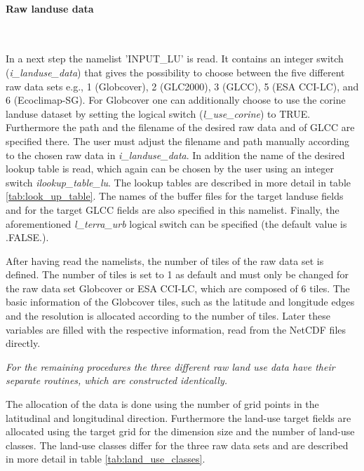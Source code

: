 \documentclass[a4paper,10pt,DIV14,BCOR1cm,titlepage,twoside]{scrartcl}
\begin{document}
\paragraph{Raw landuse data} \ \par\medskip\noindent
In a next step the namelist 'INPUT\_LU' is read. It contains an integer switch (\textit{i\_landuse\_data}) that gives the possibility to choose between the five different raw data sets e.g., 1 (Globcover), 2 (GLC2000), 3 (GLCC), 5 (ESA CCI-LC), and 6 (Ecoclimap-SG). For Globcover one can additionally choose to use the corine landuse dataset by setting the logical switch (\textit{l\_use\_corine}) to TRUE.  Furthermore the path and the filename of the desired raw data and of GLCC are specified there. The user must adjust the filename and path manually according to the chosen raw data in \textit{i\_landuse\_data}. In addition the name of the desired lookup table is read, which again can be chosen by the user using an integer switch \textit{ilookup\_table\_lu}. The lookup tables are described in more detail in table \ref{tab:look_up_table}. The names of the buffer files for the target landuse fields and for the target GLCC fields are also specified in this namelist. Finally, the aforementioned \textit{l\_terra\_urb} logical switch can be specified (the default value is .FALSE.). \par\medskip\noindent
After having read the namelists, the number of tiles of the raw data set is defined. The number of tiles is set to 1 as default and must only be changed for the raw data set Globcover or ESA CCI-LC, which are composed of 6 tiles. The basic information of the Globcover tiles, such as the latitude and longitude edges and the resolution is allocated according to the number of tiles. Later these variables are filled with the respective information, read from the NetCDF files directly. \par\medskip\noindent
\textit{For the remaining procedures the three different raw land use data have their separate routines, which are constructed identically.}  \par\medskip\noindent
The allocation of the data is done using the number of grid points in the latitudinal and longitudinal direction. Furthermore the land-use target fields are allocated using the target grid for the dimension size and the number of land-use classes. The land-use classes differ for the three raw data sets and are described in more detail in table \ref{tab:land_use_classes}. \par\medskip\noindent
\end{document}
